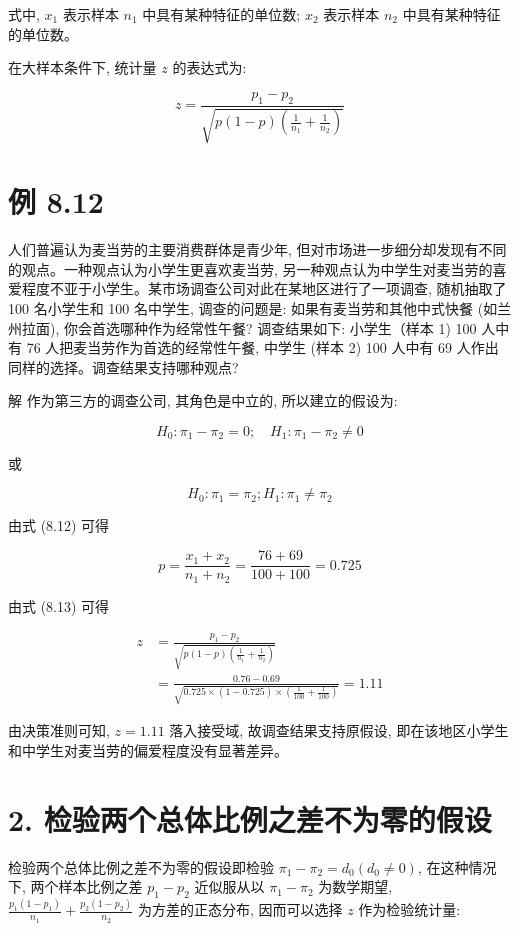 \documentclass[10pt]{article}
\begin{document}
\begin{CJK*}{UTF8}{bsmi}
式中, $x_{1}$ 表示样本 $n_{1}$ 中具有某种特征的单位数; $x_{2}$ 表示样本 $n_{2}$ 中具有某种特征的单位数。

在大样本条件下, 统计量 $z$ 的表达式为:


\begin{equation*}
z=\frac{p_{1}-p_{2}}{\sqrt{p(1-p)\left(\frac{1}{n_{1}}+\frac{1}{n_{2}}\right)}} \tag{8.13}
\end{equation*}


\section*{例 8.12}
人们普遍认为麦当劳的主要消费群体是青少年, 但对市场进一步细分却发现有不同的观点。一种观点认为小学生更喜欢麦当劳, 另一种观点认为中学生对麦当劳的喜爱程度不亚于小学生。某市场调查公司对此在某地区进行了一项调查, 随机抽取了 100 名小学生和 100 名中学生, 调查的问题是: 如果有麦当劳和其他中式快餐 (如兰州拉面), 你会首选哪种作为经常性午餐? 调查结果如下: 小学生（样本 1) 100 人中有 76 人把麦当劳作为首选的经常性午餐, 中学生 (样本 2) 100 人中有 69 人作出同样的选择。调查结果支持哪种观点?

解 作为第三方的调查公司, 其角色是中立的, 所以建立的假设为:

$$
H_{0}: \pi_{1}-\pi_{2}=0 ; \quad H_{1}: \pi_{1}-\pi_{2} \neq 0
$$

或

$$
H_{0}: \pi_{1}=\pi_{2} ; H_{1}: \pi_{1} \neq \pi_{2}
$$

由式 (8.12) 可得

$$
p=\frac{x_{1}+x_{2}}{n_{1}+n_{2}}=\frac{76+69}{100+100}=0.725
$$

由式 (8.13) 可得

$$
\begin{aligned}
z & =\frac{p_{1}-p_{2}}{\sqrt{p(1-p)\left(\frac{1}{n_{1}}+\frac{1}{n_{2}}\right)}} \\
& =\frac{0.76-0.69}{\sqrt{0.725 \times(1-0.725) \times\left(\frac{1}{100}+\frac{1}{100}\right)}}=1.11
\end{aligned}
$$

由决策准则可知, $z=1.11$ 落入接受域, 故调查结果支持原假设, 即在该地区小学生和中学生对麦当劳的偏爱程度没有显著差异。

\section*{2. 检验两个总体比例之差不为零的假设}
检验两个总体比例之差不为零的假设即检验 $\pi_{1}-\pi_{2}=d_{0}\left(d_{0} \neq 0\right)$, 在这种情况下, 两个样本比例之差 $p_{1}-p_{2}$ 近似服从以 $\pi_{1}-\pi_{2}$ 为数学期望, $\frac{p_{1}\left(1-p_{1}\right)}{n_{1}}+\frac{p_{2}\left(1-p_{2}\right)}{n_{2}}$ 为方差的正态分布, 因而可以选择 $z$ 作为检验统计量:



\end{CJK*}
\end{document}
